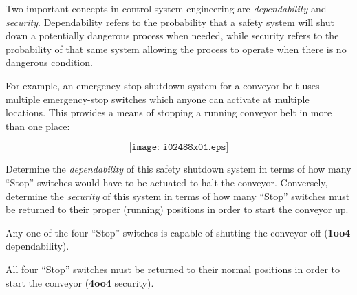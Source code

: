 

Two important concepts in control system engineering are {\it dependability} and {\it security}.  Dependability refers to the probability that a safety system will shut down a potentially dangerous process when needed, while security refers to the probability of that same system allowing the process to operate when there is no dangerous condition.  

For example, an emergency-stop shutdown system for a conveyor belt uses multiple emergency-stop switches which anyone can activate at multiple locations.  This provides a means of stopping a running conveyor belt in more than one place:

$$\texttt{[image: i02488x01.eps]}$$

Determine the {\it dependability} of this safety shutdown system in terms of how many ``Stop'' switches would have to be actuated to halt the conveyor.  Conversely, determine the {\it security} of this system in terms of how many ``Stop'' switches must be returned to their proper (running) positions in order to start the conveyor up.







Any one of the four ``Stop'' switches is capable of shutting the conveyor off ({\bf 1oo4} dependability).

\vskip 10pt

All four ``Stop'' switches must be returned to their normal positions in order to start the conveyor ({\bf 4oo4} security).











